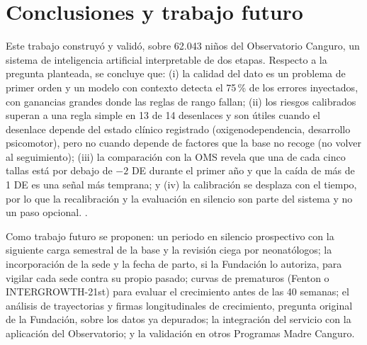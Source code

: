 \section{Conclusiones y trabajo futuro}
\label{sec:conclusiones}

Este trabajo construyó y validó, sobre 62.043 niños del Observatorio Canguro, un sistema de inteligencia artificial interpretable de dos etapas. Respecto a la pregunta planteada, se concluye que: (i) la calidad del dato es un problema de primer orden y un modelo con contexto detecta el 75\,\% de los errores inyectados, con ganancias grandes donde las reglas de rango fallan; (ii) los riesgos calibrados superan a una regla simple en 13 de 14 desenlaces y son útiles cuando el desenlace depende del estado clínico registrado (oxigenodependencia, desarrollo psicomotor), pero no cuando depende de factores que la base no recoge (no volver al seguimiento); (iii) la comparación con la OMS revela que una de cada cinco tallas está por debajo de $-2$ DE durante el primer año y que la caída de más de 1 DE es una señal más temprana; y (iv) la calibración se desplaza con el tiempo, por lo que la recalibración y la evaluación en silencio son parte del sistema y no un paso opcional. .

Como trabajo futuro se proponen: un periodo en silencio prospectivo con la siguiente carga semestral de la base y la revisión ciega por neonatólogos; la incorporación de la sede y la fecha de parto, si la Fundación lo autoriza, para vigilar cada sede contra su propio pasado; curvas de prematuros (Fenton o INTERGROWTH-21st) para evaluar el crecimiento antes de las 40 semanas; el análisis de trayectorias y firmas longitudinales de crecimiento, pregunta original de la Fundación, sobre los datos ya depurados; la integración del servicio con la aplicación del Observatorio; y la validación en otros Programas Madre Canguro.
